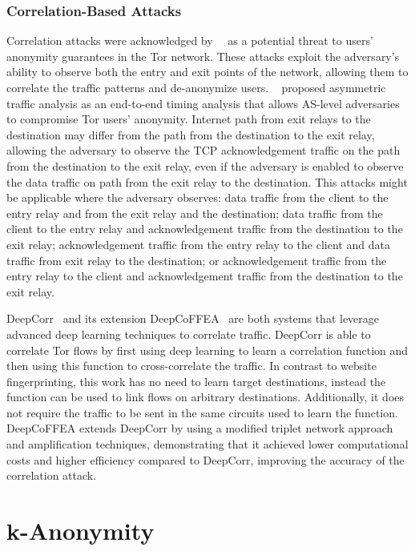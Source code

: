 \subsubsection{Correlation-Based Attacks}\label{subsubsec:correlation_based_attacks}

Correlation attacks were acknowledged by~\citeauthor{dingledine2004tor}~\cite{dingledine2004tor} as a potential threat to users' anonymity guarantees in the Tor network. These attacks exploit the adversary's ability to observe both the entry and exit points of the network, allowing them to correlate the traffic patterns and de-anonymize users.
\citeauthor{RAPTOR}~\cite{RAPTOR} proposed asymmetric traffic analysis as an end-to-end timing analysis that allows AS-level adversaries to compromise Tor users' anonymity. Internet path from exit relays to the destination may differ from the path from the destination to the exit relay, allowing the adversary to observe the TCP acknowledgement traffic on the path from the destination to the exit relay, even if the adversary is enabled to observe the data traffic on path from the exit relay to the destination. This attacks might be applicable where the adversary observes: data traffic from the client to the entry relay and from the exit relay and the destination; data traffic from the client to the entry relay and acknowledgement traffic from the destination to the exit relay; acknowledgement traffic from the entry relay to the client and data traffic from exit relay to the destination; or acknowledgement traffic from the entry relay to the client and acknowledgement traffic from the destination to the exit relay.

DeepCorr~\cite{DeepCorr} and its extension DeepCoFFEA~\cite{DeepCoFFEA} are both systems that leverage advanced deep learning techniques to correlate traffic. DeepCorr is able to correlate Tor flows by first using deep learning to learn a correlation function and then using this function to cross-correlate the traffic. In contrast to website fingerprinting, this work has no need to learn target destinations, instead the function can be used to link flows on arbitrary destinations. Additionally, it does not require the traffic to be sent in the same circuits used to learn the function. DeepCoFFEA extends DeepCorr by using a modified triplet network approach and amplification techniques, demonstrating that it achieved lower computational costs and higher efficiency compared to DeepCorr, improving the accuracy of the correlation attack.


\section{k-Anonymity}\label{sec:k_anonymity}

